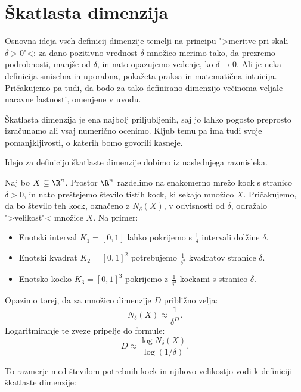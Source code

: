 \section{Škatlasta dimenzija}
Osnovna ideja vseh definicij dimenzije temelji na principu ">meritve pri skali \(\delta > 0\)"<:
za dano pozitivno vrednost \(\delta\) množico merimo tako, da prezremo podrobnosti, manjše od \(\delta\), in nato opazujemo vedenje, ko \(\delta \to 0\).
Ali je neka definicija smiselna in uporabna, pokažeta praksa in matematična intuicija.
Pričakujemo pa tudi, da bodo za tako definirano dimenzijo večinoma veljale naravne lastnosti, omenjene v uvodu.

Škatlasta dimenzija je ena najbolj priljubljenih, saj jo lahko pogosto preprosto izračunamo ali vsaj numerično ocenimo. Kljub temu pa ima tudi svoje pomanjkljivosti, o katerih bomo govorili kasneje.

\cite{matrika-fraktalna-dimenzija} Idejo za definicijo škatlaste dimenzije dobimo iz naslednjega razmisleka.

Naj bo \(X \subseteq \R^n\). Prostor \(\R^n\) razdelimo na enakomerno mrežo kock s stranico \(\delta > 0\), in nato preštejemo število tistih kock, ki sekajo množico \(X\). Pričakujemo, da bo število teh kock, označeno z \(N_\delta(X)\), v odvisnosti od \(\delta\), odražalo ">velikost"< množice \(X\).
Na primer:
\begin{itemize}
    \item Enotski interval \(K_1 = [0,1]\) lahko pokrijemo s \(\frac{1}{\delta}\) intervali dolžine \(\delta\).
    \item Enotski kvadrat \(K_2 = [0,1]^2\) potrebujemo \(\frac{1}{\delta^2}\) kvadratov stranice \(\delta\).
    \item Enotsko kocko \(K_3 = [0,1]^3\) pokrijemo z \(\frac{1}{\delta^3}\) kockami s stranico \(\delta\).
\end{itemize}
Opazimo torej, da za množico dimenzije \(D\) približno velja:
\[
N_\delta(X) \approx \frac{1}{\delta^D}.
\]
Logaritmiranje te zveze pripelje do formule:
\[
D \approx \frac{\log N_\delta(X)}{\log(1/\delta)}.
\]

To razmerje med številom potrebnih kock in njihovo velikostjo vodi k definiciji škatlaste dimenzije:

